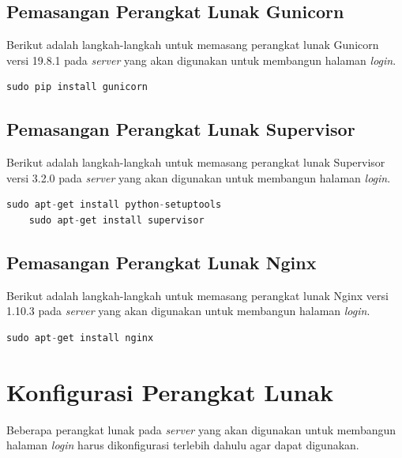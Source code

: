 \subsection{Pemasangan Perangkat Lunak Gunicorn}
Berikut adalah langkah-langkah untuk memasang perangkat lunak Gunicorn versi 19.8.1 pada \textit{server} yang akan digunakan untuk membangun halaman \textit{login}.\\
\begin{minipage}{\linewidth}
 	\begin{lstlisting}[caption=Command untuk installasi Gunicorn,language=Python,label=installgunicorndiserverlogin]
 	sudo pip install gunicorn
 	\end{lstlisting}
\end{minipage}

\subsection{Pemasangan Perangkat Lunak Supervisor}
Berikut adalah langkah-langkah untuk memasang perangkat lunak Supervisor versi 3.2.0 pada \textit{server} yang akan digunakan untuk membangun halaman \textit{login}.\\
\begin{minipage}{\linewidth}
 	\begin{lstlisting}[caption=Command untuk installasi Supervisor,language=Python,label=installsupervisordiserverlogin]
 	sudo apt-get install python-setuptools
 	sudo apt-get install supervisor
 	\end{lstlisting}
\end{minipage}

\subsection{Pemasangan Perangkat Lunak Nginx}
Berikut adalah langkah-langkah untuk memasang perangkat lunak Nginx versi 1.10.3 pada \textit{server} yang akan digunakan untuk membangun halaman \textit{login}.\\
\begin{minipage}{\linewidth}
 	\begin{lstlisting}[caption=Command untuk installasi Nginx,language=Python,label=installnginx]
 	sudo apt-get install nginx
 	\end{lstlisting}
\end{minipage}

\section{Konfigurasi Perangkat Lunak}
Beberapa perangkat lunak pada \textit{server} yang akan digunakan untuk membangun halaman \textit{login} harus dikonfigurasi terlebih dahulu agar dapat digunakan.

